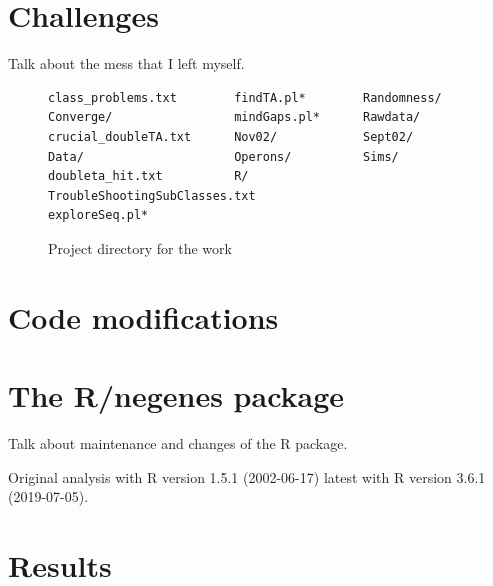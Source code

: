 \section{Challenges}

Talk about the mess that I left myself.

\begin{figure}

\begin{lstlisting}
class_problems.txt        findTA.pl*        Randomness/
Converge/                 mindGaps.pl*      Rawdata/
crucial_doubleTA.txt      Nov02/            Sept02/
Data/                     Operons/          Sims/
doubleta_hit.txt          R/                TroubleShootingSubClasses.txt
exploreSeq.pl*
\end{lstlisting}

\caption{Project directory for the work}
\end{figure}


\section{Code modifications}

\section{The R/negenes package}

Talk about maintenance and changes of the R package.

Original analysis with R version 1.5.1 (2002-06-17)
latest with R version 3.6.1 (2019-07-05).


\section{Results}


